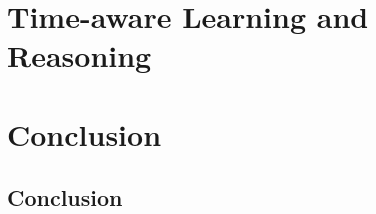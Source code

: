 \documentclass[a4paper,twoside,openright]{book}
\theoremstyle{plain}
\theoremstyle{definition}
\begin{document}
\part{Time-aware Learning and Reasoning}






\part*{Conclusion}
\label{part:conc}
\chapter{Conclusion}
\label{chap:concl}


\listoffigures
\listoftables




\appendix











\end{document}
